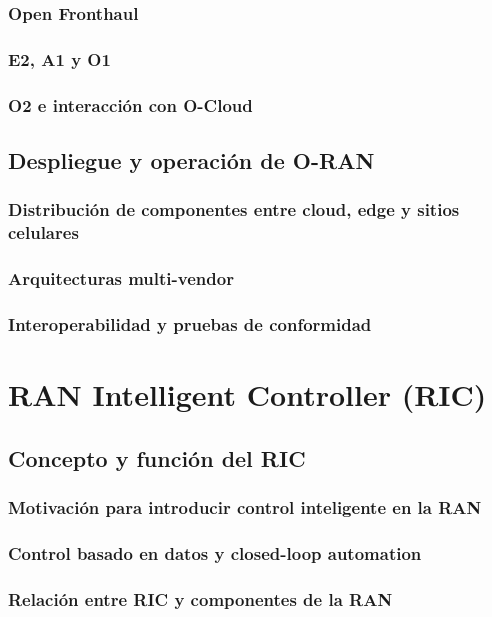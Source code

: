 \documentclass[11pt,a4paper]{article}
\makeatletter
\let\ORIGsection\section
\def\section{\@nobreakfalse\ORIGsection}
\let\ORIGsubsection\subsection
\def\subsection{\@nobreakfalse\ORIGsubsection}
\let\ORIGsubsubsection\subsubsection
\def\subsubsection{\@nobreakfalse\ORIGsubsubsection}
\makeatother
\begin{document}
\subsubsection{Open Fronthaul}
\subsubsection{E2, A1 y O1}
\subsubsection{O2 e interacción con O-Cloud}

\subsection{Despliegue y operación de O-RAN}

\subsubsection{Distribución de componentes entre cloud, edge y sitios celulares}
\subsubsection{Arquitecturas multi-vendor}
\subsubsection{Interoperabilidad y pruebas de conformidad}


\section{RAN Intelligent Controller (RIC)}

\subsection{Concepto y función del RIC}

\subsubsection{Motivación para introducir control inteligente en la RAN}
\subsubsection{Control basado en datos y closed-loop automation}
\subsubsection{Relación entre RIC y componentes de la RAN}
\end{document}
